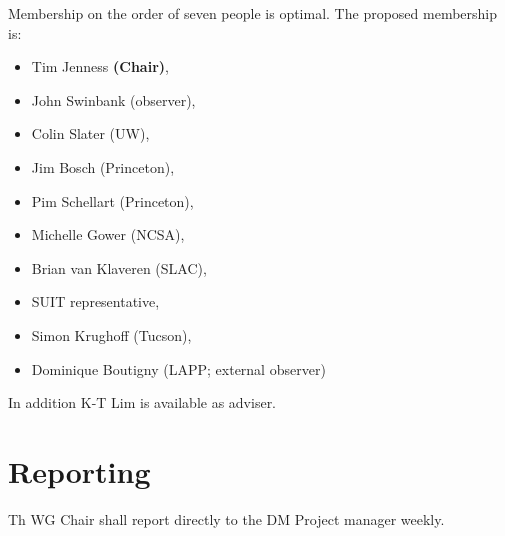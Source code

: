 Membership on the order of seven people is optimal.
The proposed membership is:

\begin{itemize}
  \item Tim Jenness \textbf{(Chair)},
  \item John Swinbank (observer),
  \item Colin Slater (UW),
  \item Jim Bosch (Princeton),
  \item Pim Schellart (Princeton),
  \item Michelle Gower (NCSA),
  \item Brian van Klaveren (SLAC),
  \item SUIT representative,
  \item Simon Krughoff (Tucson),
  \item Dominique Boutigny (LAPP; external observer)
\end{itemize}

In addition K-T Lim is available as adviser.

\section{Reporting}

Th WG Chair shall report directly to the DM Project manager weekly.
